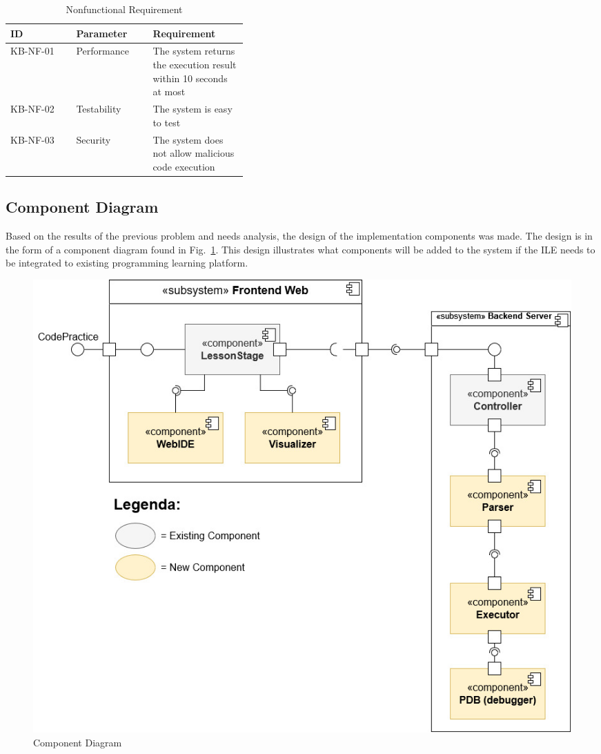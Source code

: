 \documentclass[conference]{IEEEtran}
\begin{document}
\begin{table}[htbp]
  \caption{Nonfunctional Requirement}
  \begin{center}
    \begin{tabular}{|l|l|p{0.4\linewidth}|}
      \hline
      \textbf{ID} & \textbf{Parameter} & \textbf{Requirement}                                              \\ \hline
      KB-NF-01    & Performance        & The system returns the execution result within 10 seconds at most \\ \hline
      KB-NF-02    & Testability        & The system is easy to test                                        \\ \hline
      KB-NF-03    & Security           & The system does not allow malicious code execution                \\ \hline
    \end{tabular}
    \label{tab:srs-nonfungsional}
  \end{center}
\end{table}

\subsection{Component Diagram}
Based on the results of the previous problem and needs analysis, the design of the implementation components was made. The design is in the form of a component diagram found in Fig.~\ref{fig:diagram-komponen}. This design illustrates what components will be added to the system if the ILE needs to be integrated to existing programming learning platform.
\begin{figure}[htbp]
  \centerline{\includegraphics[width=0.8\linewidth]{chapter3/diagram_komponen_paper.jpg}}
  \caption{Component Diagram} \label{fig:diagram-komponen}
\end{figure}
\end{document}
